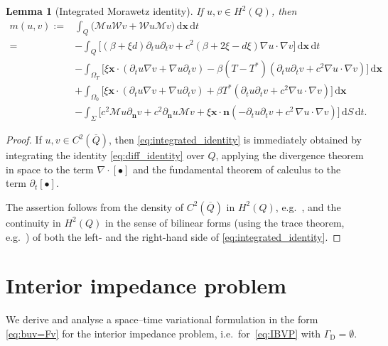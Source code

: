 \documentclass[a4paper]{article}
\theoremstyle{plain}
\newtheorem{lemma}[theorem]{Lemma}
\theoremstyle{definition}
\newcommand{\conj}[1]{\overline{#1}}
\newcommand{\operator}[1]{\mathcal{#1}}
\newcommand{\dx}{{\,\mathrm{d}\vect x}}
\newcommand{\dt}{{\,\mathrm{d}t}}
\newcommand{\dS}{{\,\mathrm{d}S}}
\newcommand{\Div}[1]{\nabla \cdot #1}
\newcommand{\Grad}[1]{\nabla #1}
\newcommand{\TimeDer}{{\partial^{}_t}}
\newcommand{\NormDer}{{\partial_{\bm{n}}}}
\newcommand{\vect}[1]{\bm{#1}}
\newcommand{\GD}{{\Gamma_{\mathrm D}}}
\begin{document}
\begin{lemma}[Integrated Morawetz identity]\label{lem:integrated_identity}
If $u,v\in H^2(Q)$, then
\begin{equation}
		\label{eq:integrated_identity}
		\begin{split}
			m(u,v) :=& \int_Q \big(\operator{M}u \operator{W}v  + \operator{W}u\operator{M}v \big) \dx \dt \\
			=&- \int_Q \big[(\beta + \xi d)\TimeDer{u}\TimeDer{v} + c^2 (\beta + 2 \xi - d\xi)\Grad u \cdot \Grad v \big] \dx \dt \\
&- \int_{\Omega_T} \big[\xi \vect{x} \cdot ( \TimeDer{u} \Grad v + \Grad u \TimeDer{v})
- \beta (T-T^*)(\TimeDer{u} \TimeDer{v} + c^2 \Grad u \cdot \Grad v)\big] \dx  \\
&+ \int_{\Omega_0} \big[\xi \vect{x} \cdot ( \TimeDer{u}\Grad v + \Grad u \TimeDer{v} )
+\beta T^* (\TimeDer{u} \TimeDer{v} + c^2 \Grad u \cdot \Grad v ) \big] \dx\\
& -\int_\Sigma \big[c^2 \operator{M} u\NormDer{v} + c^2\NormDer{u} \operator{M} v
				+ \xi \vect{x} \cdot \vect{n} (- \TimeDer{u} \TimeDer{v}
				+ c^2 \,\Grad u \cdot \Grad v) \big] \dS\dt.
		\end{split}
	\end{equation}
\end{lemma}
\begin{proof}
	If $u,v\in C^2(\conj Q)$,
then \eqref{eq:integrated_identity} is immediately obtained by integrating the identity \eqref{eq:diff_identity} over $Q$, applying the divergence theorem \cite[Thm.~3.34]{McLean00} in space to the term $\Div[\bullet]$ and the fundamental theorem of calculus to the term $\TimeDer[\bullet]$.

	The assertion follows from the density of $C^2(\conj Q)$ in $H^2(Q)$, e.g.\ \cite[Thm.~3.29]{McLean00}, and the continuity in $H^2(Q)$ in the sense of bilinear forms (using the trace theorem, e.g.\ \cite[Thm.~3.37]{McLean00}) of both the left- and the right-hand side of \eqref{eq:integrated_identity}.
\end{proof}


\section{Interior impedance problem}
\label{sec:interior_problem}

We derive and analyse a space--time variational formulation in the form \eqref{eq:buv=Fv} for the interior impedance problem, i.e.\ for~\eqref{eq:IBVP} with $\GD=\emptyset$.
\end{document}
